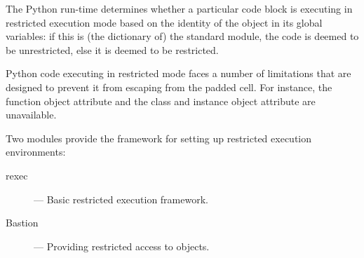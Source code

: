 The Python run-time determines whether a particular code block is
executing in restricted execution mode based on the identity of the
 object in its global variables: if this is (the
dictionary of) the standard  module, the code is
deemed to be unrestricted, else it is deemed to be restricted.

Python code executing in restricted mode faces a number of limitations
that are designed to prevent it from escaping from the padded cell.
For instance, the function object attribute  and the
class and instance object attribute  are unavailable.

Two modules provide the framework for setting up restricted execution
environments:

\begin{description}

\item[rexec]
--- Basic restricted execution framework.

\item[Bastion]
--- Providing restricted access to objects.

\end{description}
